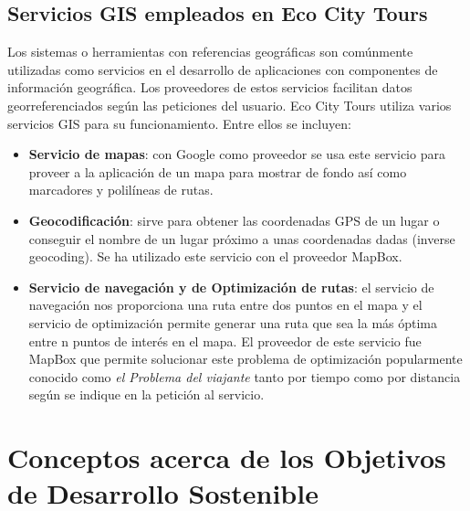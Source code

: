 	\subsection{Servicios GIS empleados en Eco City Tours}
	Los sistemas o herramientas con referencias geográficas son comúnmente utilizadas como servicios en el desarrollo de aplicaciones con componentes de información geográfica. Los proveedores de estos servicios facilitan datos georreferenciados según las peticiones del usuario. Eco City Tours utiliza varios servicios GIS para su funcionamiento. Entre ellos se incluyen:
	\begin{itemize}
		\item \textbf{Servicio de mapas}: con Google como proveedor se usa este servicio para proveer a la aplicación de un mapa para mostrar de fondo así como marcadores y polilíneas de rutas.
		
		\item \textbf{Geocodificación}: sirve para obtener las coordenadas GPS de un lugar o conseguir el nombre de un lugar próximo a unas coordenadas dadas (inverse geocoding). Se ha utilizado este servicio con el proveedor MapBox.
		
		\item \textbf{Servicio de navegación y de Optimización de rutas}: el servicio de navegación nos proporciona una ruta entre dos puntos en el mapa y el servicio de optimización permite generar una ruta que sea la más óptima entre n puntos de interés en el mapa. El proveedor de este servicio fue MapBox que permite solucionar este problema de optimización popularmente conocido como \textit{el Problema del viajante} tanto por tiempo como por distancia según se indique en la petición al servicio.
		
	\end{itemize}
	
\section{Conceptos acerca de los Objetivos de Desarrollo Sostenible}
